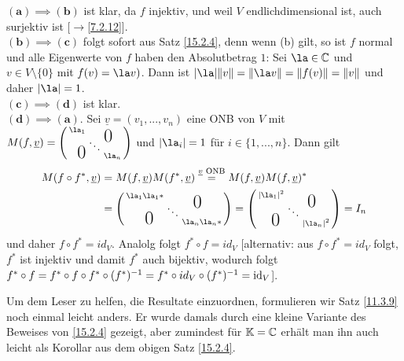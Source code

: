 \documentclass[../../main.tex]{subfiles}
\begin{document}
\begin{cproof}
$\boldsymbol{(a)\implies(b)}$ ist klar, da $f$ injektiv, und weil $V$ endlichdimensional ist, auch surjektiv ist [$\to$\ref{7.2.12}].\\
		
\noindent$\boldsymbol{(b)\implies(c)}$ folgt sofort aus Satz \ref{15.2.4}, denn wenn (b) gilt, so ist $f$ normal und alle Eigenwerte von $f$ haben den Absolutbetrag $1$: Sei $\la\in \C$ und $v\in V\setminus\{0\}$ mit $f(v)=\la v)$. Dann ist $\vert\la\vert\| v\|=\|\la v\|=\|f(v)\|=\|v\|$ und daher $\vert \la\vert=1$. \\
		
\noindent$\boldsymbol{(c)\implies(d)}$ ist klar.\\
		
\noindent$\boldsymbol{(d)\implies(a)}.$ Sei $\underline{v}=(v_1,...,v_n)$ eine ONB von $V$ mit $M(f,\underline{v})=\left(\begin{smallmatrix}
\la_1 & & \llap{$\overset{\blap{\LARGE 0}}{~}$} \\
& \ddots &\\
\rlap{\tlap{\LARGE 0}} & & \la_n
\end{smallmatrix}\right)$ und $\vert \la_i\vert=1$ für $i\in\{1,...,n\}$. Dann gilt
\begin{align*}
M(f\circ f^*,\v)&=M(f,\v)M(f^*,\v)\stackrel{\v\text{ ONB}}{=}M(f,\underline{v})M(f,\v)^*\\
&=\left(\begin{smallmatrix}
\la_1\la_1* & & \llap{$\overset{\blap{\LARGE 0}}{~}$} \\
& \ddots &\\
\rlap{\tlap{\LARGE 0}} & & \la_n\la_n*
\end{smallmatrix}\right)
=\left(\begin{smallmatrix}
\vert \la_1\vert^2 & & \llap{$\overset{\blap{\LARGE 0}}{~}$} \\
& \ddots &\\
\rlap{\tlap{\LARGE 0}} & & \vert \la_n\vert^2
\end{smallmatrix}\right)=I_n
\end{align*}
und daher $f\circ f^*=id_V$. Analolg folgt $f^*\circ f=id_V$ [alternativ: aus $f\circ f^*=id_V$ folgt, $f^*$ ist injektiv und damit $f^*$ auch bijektiv, wodurch folgt $f^*\circ f=f^*\circ f\circ f^*\circ(f^*)^{-1}=f^*\circ id_V\circ (f^*)^{-1}=\operatorname{id}_V$].
\end{cproof}

\noindent Um dem Leser zu helfen, die Resultate einzuordnen, formulieren wir Satz \ref{11.3.9} noch einmal leicht anders. Er wurde damals durch eine kleine Variante des Beweises von \ref{15.2.4} gezeigt, aber zumindest für $\mathbb K=\mathbb C$ erhält man ihn auch leicht als Korollar aus dem obigen Satz \ref{15.2.4}.
\end{document}
